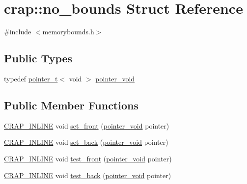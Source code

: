 \hypertarget{structcrap_1_1no__bounds}{}\section{crap\+:\+:no\+\_\+bounds Struct Reference}
\label{structcrap_1_1no__bounds}


{\ttfamily \#include $<$memorybounds.\+h$>$}

\subsection*{Public Types}
\begin{DoxyCompactItemize}
\item 
typedef \hyperlink{structcrap_1_1pointer__t}{pointer\+\_\+t}$<$ void $>$ \hyperlink{structcrap_1_1no__bounds_a674e7cd02d3b54fe9a3690e9aa735468}{pointer\+\_\+void}
\end{DoxyCompactItemize}
\subsection*{Public Member Functions}
\begin{DoxyCompactItemize}
\item 
\hyperlink{config__x86_8h_a5a40526b8d842e7ff731509998bb0f1c}{C\+R\+A\+P\+\_\+\+I\+N\+L\+I\+N\+E} void \hyperlink{structcrap_1_1no__bounds_a2c55be64893f89ebeafcba22bbb547d8}{set\+\_\+front} (\hyperlink{structcrap_1_1no__bounds_a674e7cd02d3b54fe9a3690e9aa735468}{pointer\+\_\+void} pointer)
\item 
\hyperlink{config__x86_8h_a5a40526b8d842e7ff731509998bb0f1c}{C\+R\+A\+P\+\_\+\+I\+N\+L\+I\+N\+E} void \hyperlink{structcrap_1_1no__bounds_aa9fd7264cf915712a56806823d363c51}{set\+\_\+back} (\hyperlink{structcrap_1_1no__bounds_a674e7cd02d3b54fe9a3690e9aa735468}{pointer\+\_\+void} pointer)
\item 
\hyperlink{config__x86_8h_a5a40526b8d842e7ff731509998bb0f1c}{C\+R\+A\+P\+\_\+\+I\+N\+L\+I\+N\+E} void \hyperlink{structcrap_1_1no__bounds_a0d2d29eb3bd251024f251b73a833e9a6}{test\+\_\+front} (\hyperlink{structcrap_1_1no__bounds_a674e7cd02d3b54fe9a3690e9aa735468}{pointer\+\_\+void} pointer)
\item 
\hyperlink{config__x86_8h_a5a40526b8d842e7ff731509998bb0f1c}{C\+R\+A\+P\+\_\+\+I\+N\+L\+I\+N\+E} void \hyperlink{structcrap_1_1no__bounds_a1adaf98cdfd0a7810735393837f69906}{test\+\_\+back} (\hyperlink{structcrap_1_1no__bounds_a674e7cd02d3b54fe9a3690e9aa735468}{pointer\+\_\+void} pointer)
\end{DoxyCompactItemize}
